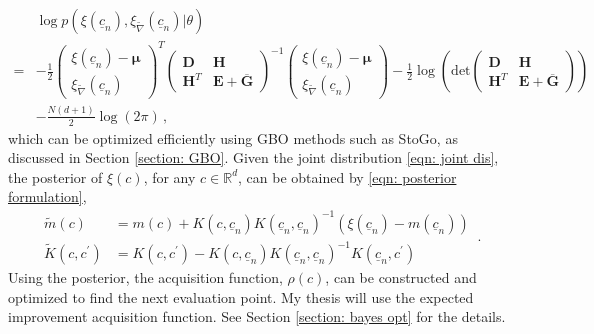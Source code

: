 \begin{equation}\begin{split}
    &\log p(\xi(\underline{c}_n), \xi_{\tilde{\nabla}}(\underline{c}_n) | \theta) \\ 
    =&
    - \frac{1}{2} 
    \begin{pmatrix}
        \xi(\underline{c}_n) - \boldsymbol{\mu}\\ \xi_{\tilde{\nabla}}(\underline{c}_n)
    \end{pmatrix}^T
    \begin{pmatrix}
        \boldsymbol{D}& \boldsymbol{H}\\
        \boldsymbol{H}^T & \boldsymbol{E}+\overline{\boldsymbol{G}}
    \end{pmatrix}^{-1}
    \begin{pmatrix}
        \xi(\underline{c}_n) -\boldsymbol{\mu}\\ \xi_{\tilde{\nabla}}(\underline{c}_n)
    \end{pmatrix}
    - \frac{1}{2}
    \log \left(\textrm{det}
        \begin{pmatrix}
            \boldsymbol{D}& \boldsymbol{H}\\
            \boldsymbol{H}^T & \boldsymbol{E}+\overline{\boldsymbol{G}}
        \end{pmatrix}       
    \right) \\
    &- \frac{N(d+1)}{2} \log(2\pi)\,,
\end{split}\label{eqn: likelihood eqn}
\end{equation}
which can be optimized efficiently using GBO methods such as StoGo, 
as discussed in Section \ref{section: GBO}. Given the joint distribution
\eqref{eqn: joint dis}, the posterior of $\xi(c)$, for any $c\in \mathbb{R}^d$, 
can be obtained by \eqref{eqn: posterior formulation},
\begin{equation*}\begin{split}
    \tilde{m}(c) & 
    = m(c) + K(c,\underline{c}_n)K(\underline{c}_n,\underline{c}_n)^{-1}
    \left(\xi(\underline{c}_n) - m(\underline{c}_n)\right)\\
    \tilde{K}(c, c^\prime)&=
    K(c,c^\prime) - K(c,\underline{c}_n) K(\underline{c}_n, \underline{c}_n)^{-1} K(\underline{c}_n,c^\prime)
\end{split}\,.
\label{eqn: posterior formulation}
\end{equation*}
Using the posterior, the acquisition function, $\rho(c)$, can be constructed and optimized
to find the next evaluation point. My thesis will use the expected improvement acquisition function.
See Section \ref{section: bayes opt} for the details.


